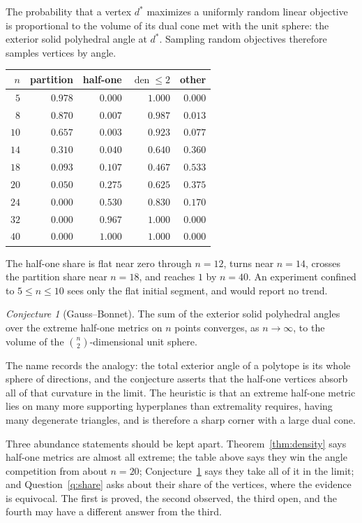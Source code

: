 \documentclass[11pt]{article}
\theoremstyle{definition}
\theoremstyle{remark}
\newtheorem{conjecture}[theorem]{Conjecture}
\newcommand{\den}{\operatorname{den}}
\begin{document}
The probability that a vertex $d^*$ maximizes a uniformly random linear objective is
proportional to the volume of its dual cone met with the unit sphere: the exterior solid
polyhedral angle at $d^*$. Sampling random objectives therefore samples vertices by angle.

\begin{center}
\begin{tabular}{r|rrrr}
$n$ & partition & half-one & $\den\leq2$ & other\\
\hline
$5$ & $0.978$ & $0.000$ & $1.000$ & $0.000$\\
$8$ & $0.870$ & $0.007$ & $0.987$ & $0.013$\\
$10$ & $0.657$ & $0.003$ & $0.923$ & $0.077$\\
$14$ & $0.310$ & $0.040$ & $0.640$ & $0.360$\\
$18$ & $0.093$ & $0.107$ & $0.467$ & $0.533$\\
$20$ & $0.050$ & $0.275$ & $0.625$ & $0.375$\\
$24$ & $0.000$ & $0.530$ & $0.830$ & $0.170$\\
$32$ & $0.000$ & $0.967$ & $1.000$ & $0.000$\\
$40$ & $0.000$ & $1.000$ & $1.000$ & $0.000$
\end{tabular}
\end{center}

The half-one share is flat near zero through $n=12$, turns near $n=14$, crosses the
partition share near $n=18$, and reaches $1$ by $n=40$. An experiment confined to
$5\leq n\leq10$ sees only the flat initial segment, and would report no trend.

\begin{conjecture}[Gauss--Bonnet]\label{conj:gb}
The sum of the exterior solid polyhedral angles over the extreme half-one metrics on $n$
points converges, as $n\to\infty$, to the volume of the $\binom n2$-dimensional unit
sphere.
\end{conjecture}

The name records the analogy: the total exterior angle of a polytope is its whole sphere of
directions, and the conjecture asserts that the half-one vertices absorb all of that
curvature in the limit. The heuristic is that an extreme half-one metric lies on many more
supporting hyperplanes than extremality requires, having many degenerate triangles, and is
therefore a sharp corner with a large dual cone.

Three abundance statements should be kept apart. Theorem~\ref{thm:density} says half-one
metrics are almost all extreme; the table above says they win the angle competition from
about $n=20$; Conjecture~\ref{conj:gb} says they take all of it in the limit; and
Question~\ref{q:share} asks about their share of the vertices, where the evidence is
equivocal. The first is proved, the second observed, the third open, and the fourth may
have a different answer from the third.
\end{document}
